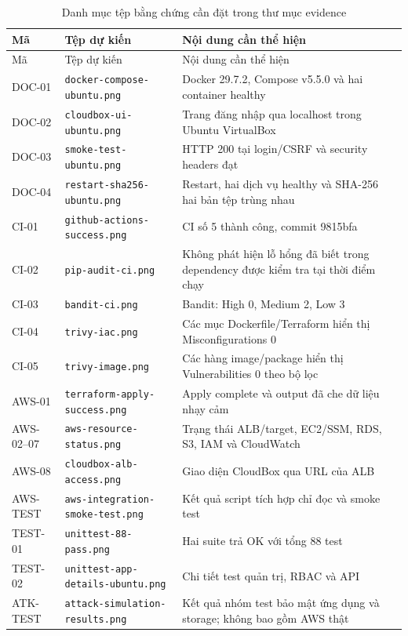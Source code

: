 \begin{longtable}{P{1.8cm}P{5.0cm}P{6.0cm}}
\caption{Danh mục tệp bằng chứng cần đặt trong thư mục evidence}\\\toprule
\textbf{Mã}&\textbf{Tệp dự kiến}&\textbf{Nội dung cần thể hiện}\\\midrule\endfirsthead
\toprule Mã&Tệp dự kiến&Nội dung cần thể hiện\\\midrule\endhead
DOC-01 & \nolinkurl{docker-compose-ubuntu.png} & Docker 29.7.2, Compose v5.5.0 và hai container healthy\\
DOC-02 & \nolinkurl{cloudbox-ui-ubuntu.png} & Trang đăng nhập qua localhost trong Ubuntu VirtualBox\\
DOC-03 & \nolinkurl{smoke-test-ubuntu.png} & HTTP 200 tại login/CSRF và security headers đạt\\
DOC-04 & \nolinkurl{restart-sha256-ubuntu.png} & Restart, hai dịch vụ healthy và SHA-256 hai bản tệp trùng nhau\\
CI-01 & \nolinkurl{github-actions-success.png} & CI số 5 thành công, commit 9815bfa\\
CI-02 & \nolinkurl{pip-audit-ci.png} & Không phát hiện lỗ hổng đã biết trong dependency được kiểm tra tại thời điểm chạy\\
CI-03 & \nolinkurl{bandit-ci.png} & Bandit: High 0, Medium 2, Low 3\\
CI-04 & \nolinkurl{trivy-iac.png} & Các mục Dockerfile/Terraform hiển thị Misconfigurations 0\\
CI-05 & \nolinkurl{trivy-image.png} & Các hàng image/package hiển thị Vulnerabilities 0 theo bộ lọc\\
AWS-01 & \nolinkurl{terraform-apply-success.png} & Apply complete và output đã che dữ liệu nhạy cảm\\
AWS-02--07 & \nolinkurl{aws-resource-status.png} & Trạng thái ALB/target, EC2/SSM, RDS, S3, IAM và CloudWatch\\
AWS-08 & \nolinkurl{cloudbox-alb-access.png} & Giao diện CloudBox qua URL của ALB\\
AWS-TEST & \nolinkurl{aws-integration-smoke-test.png} & Kết quả script tích hợp chỉ đọc và smoke test\\
TEST-01 & \nolinkurl{unittest-88-pass.png} & Hai suite trả OK với tổng 88 test\\
TEST-02 & \nolinkurl{unittest-app-details-ubuntu.png} & Chi tiết test quản trị, RBAC và API\\
ATK-TEST & \nolinkurl{attack-simulation-results.png} & Kết quả nhóm test bảo mật ứng dụng và storage; không bao gồm AWS thật\\\bottomrule
\end{longtable}

